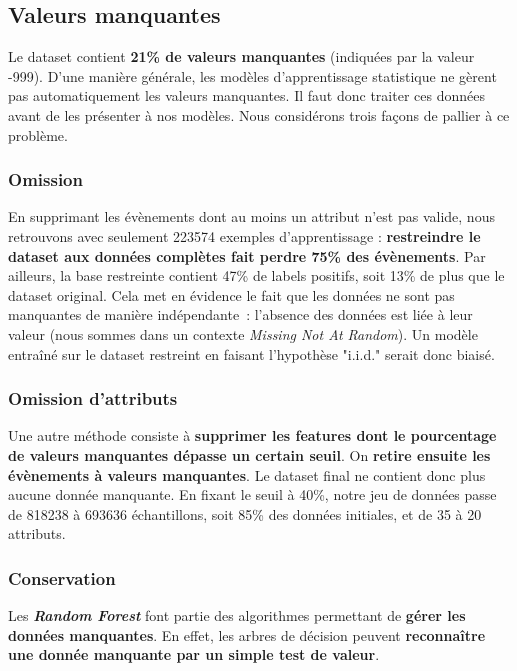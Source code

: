 \documentclass[12pt]{article}
\begin{document}
\subsection{Valeurs manquantes}

Le dataset contient \textbf{21\% de valeurs manquantes} (indiquées par la valeur
-999).  D’une manière générale, les modèles d’apprentissage statistique ne
gèrent pas automatiquement les valeurs manquantes. Il faut donc traiter ces
données avant de les présenter à nos modèles. Nous considérons trois façons de
pallier à ce problème.

\subsubsection{Omission}

En supprimant les évènements dont au moins un attribut n'est pas valide, nous
retrouvons avec seulement 223574 exemples d’apprentissage : \textbf{restreindre
le dataset aux données complètes fait perdre 75\% des évènements}. Par ailleurs,
la base restreinte contient 47\% de labels positifs, soit 13\% de plus que le
dataset original. Cela met en évidence le fait que les données ne sont pas
manquantes de manière indépendante : l’absence des données est liée à leur
valeur (nous sommes dans un contexte \emph{Missing Not At Random}). Un modèle
entraîné sur le dataset restreint en faisant l’hypothèse "i.i.d." serait donc
biaisé.

\subsubsection{Omission d'attributs}

Une autre méthode consiste à \textbf{supprimer les features dont le pourcentage
de valeurs manquantes dépasse un certain seuil}. On \textbf{retire ensuite les
évènements à valeurs manquantes}. Le dataset final ne contient donc plus aucune
donnée manquante. En fixant le seuil à 40\%, notre jeu de données passe de
818238 à 693636 échantillons, soit 85\% des données initiales, et de 35 à 20
attributs.


\subsubsection{Conservation}

Les \textbf{\emph{Random Forest}} font partie des algorithmes permettant de
\textbf{gérer les données manquantes}. En effet, les arbres de décision peuvent
\textbf{reconnaître une donnée manquante par un simple test de valeur}.
\end{document}
